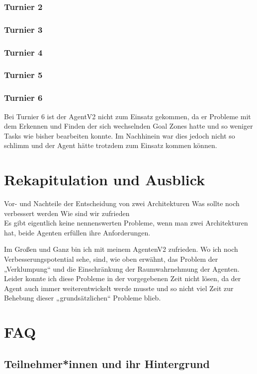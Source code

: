 \documentclass[runningheads]{llncs}
\begin{document}
\subsubsection{Turnier 2}
\subsubsection{Turnier 3}
\subsubsection{Turnier 4}
\subsubsection{Turnier 5}
\subsubsection{Turnier 6\\}
Bei Turnier 6 ist der AgentV2 nicht zum Einsatz gekommen, da er Probleme mit dem Erkennen und Finden der sich wechselnden Goal Zones hatte und so weniger Tasks wie bisher bearbeiten konnte. Im Nachhinein war dies jedoch nicht so schlimm und der Agent hätte trotzdem zum Einsatz kommen können. 

\section{Rekapitulation und Ausblick}
Vor- und Nachteile der Entscheidung von zwei Architekturen
Was sollte noch verbessert werden
Wie sind wir zufrieden\\

Es gibt eigentlich keine nennenswerten Probleme, wenn man zwei Architekturen hat, beide Agenten erfüllen ihre Anforderungen. 

Im Großen und Ganz bin ich mit meinem AgentenV2 zufrieden. Wo ich noch Verbesserungspotential sehe, sind, wie oben erwähnt, das Problem der „Verklumpung“ und die Einschränkung der Raumwahrnehmung der Agenten. Leider konnte ich diese Probleme in der vorgegebenen Zeit nicht lösen, da der Agent auch immer weiterentwickelt werde musste und so nicht viel Zeit zur Behebung dieser „grundsätzlichen“ Probleme blieb.

\section{FAQ}
\subsection{Teilnehmer*innen und ihr Hintergrund}
\end{document}
